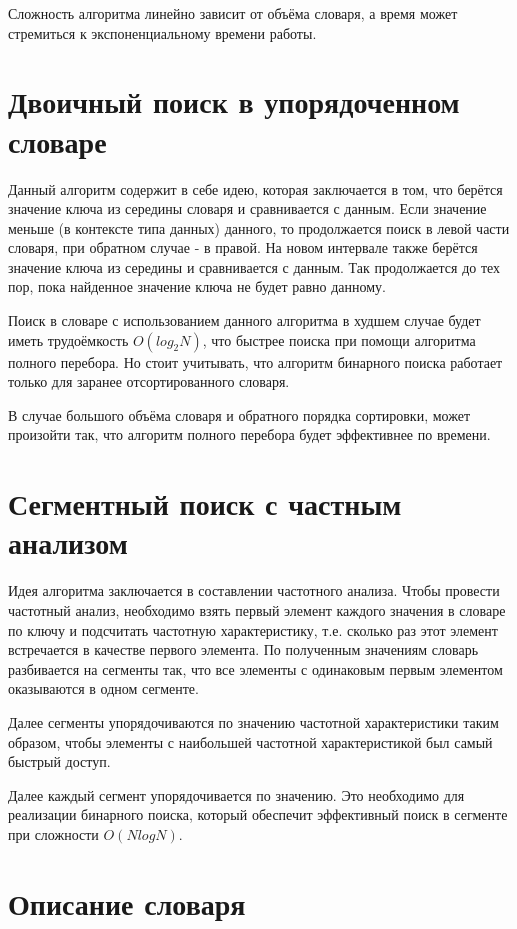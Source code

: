 \documentclass[12pt,a4paper]{report}
\begin{document}
Сложность алгоритма линейно зависит от объёма словаря, а время может стремиться к экспоненциальному времени 
работы.  

\section{Двоичный поиск в упорядоченном словаре}

Данный алгоритм содержит в себе идею, которая заключается в том, что берётся значение ключа из середины словаря и 
сравнивается с данным. 
Если значение меньше (в контексте типа данных) данного, то продолжается поиск в левой части словаря, при обратном случае - в правой. 
На новом интервале также берётся значение ключа из середины и сравнивается с данным. 
Так продолжается до тех пор, пока найденное значение ключа не будет равно данному\cite{analyse_info}.

Поиск в словаре с использованием данного алгоритма в худшем случае будет иметь трудоёмкость $O(log_{2}N)$, что быстрее 
поиска при помощи алгоритма полного перебора. 
Но стоит учитывать, что алгоритм бинарного поиска работает только для заранее отсортированного словаря. 

В случае большого объёма словаря и обратного порядка сортировки, может произойти так, что алгоритм полного перебора 
будет эффективнее по времени.  

\section{Сегментный поиск с частным анализом}

Идея алгоритма заключается в составлении частотного анализа. Чтобы провести частотный анализ, необходимо взять
первый элемент каждого значения в словаре по ключу и подсчитать частотную характеристику, т.е. сколько раз этот 
элемент встречается в качестве первого элемента. По полученным значениям словарь разбивается на сегменты так, 
что все элементы с одинаковым первым элементом оказываются в одном сегменте.

Далее сегменты упорядочиваются по значению частотной характеристики таким образом, чтобы элементы с наибольшей 
частотной характеристикой был самый быстрый доступ.

Далее каждый сегмент упорядочивается по значению. Это необходимо для реализации бинарного поиска, который 
обеспечит эффективный поиск в сегменте при сложности $O(N log N)$.

\section{Описание словаря}
\end{document}
